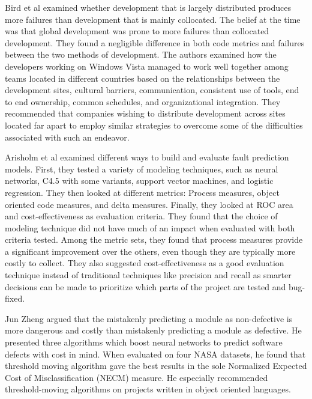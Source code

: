 \documentclass{sig-alternate-05-2015}
\begin{document}
Bird et al \cite{Bird} examined whether development that is largely distributed produces more failures than development that is mainly collocated. The belief at the time was that global development was prone to more failures than collocated development. They found a negligible difference in both code metrics and failures between the two methods of development. The authors examined how the developers working on Windows Vista managed to work well together among teams located in different countries based on the relationships between the development sites, cultural barriers, communication, consistent use of tools, end to end ownership, common schedules, and organizational integration. They recommended that companies wishing to distribute development across sites located far apart to employ similar strategies to overcome some of the difficulties associated with such an endeavor. 

Arisholm et al \cite{Arisholm} examined different ways to build and evaluate fault prediction models. First, they tested a variety of modeling techniques, such as neural networks, C4.5 with some variants, support vector machines, and logistic regression. They then looked at different metrics:  Process measures, object oriented code measures, and delta measures. Finally, they looked at ROC area and cost-effectiveness as evaluation criteria. They found that the choice of modeling technique did not have much of an impact when evaluated with both criteria tested. Among the metric sets, they found that process measures provide a significant improvement over the others, even though they are typically more costly to collect.  They also suggested cost-effectiveness as a good evaluation technique instead of traditional techniques like precision and recall as smarter decisions can be made to prioritize which parts of the project are tested and bug-fixed.

Jun Zheng \cite{zheng2010} argued that the mistakenly predicting a module as non-defective is more dangerous and costly than mistakenly predicting a module as defective. He presented three algorithms which boost neural networks to predict software defects with cost in mind. When evaluated on four NASA datasets, he found that threshold moving algorithm gave the best results in the sole Normalized Expected Cost of Misclassification (NECM) measure. He especially recommended threshold-moving algorithms on projects written in object oriented languages.
\end{document}
